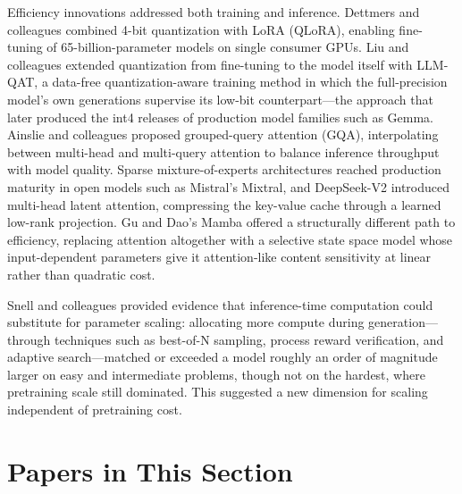 Efficiency innovations addressed both training and inference. Dettmers and colleagues combined 4-bit quantization with LoRA (QLoRA), enabling fine-tuning of 65-billion-parameter models on single consumer GPUs. Liu and colleagues extended quantization from fine-tuning to the model itself with LLM-QAT, a data-free quantization-aware training method in which the full-precision model's own generations supervise its low-bit counterpart---the approach that later produced the int4 releases of production model families such as Gemma. Ainslie and colleagues proposed grouped-query attention (GQA), interpolating between multi-head and multi-query attention to balance inference throughput with model quality. Sparse mixture-of-experts architectures reached production maturity in open models such as Mistral's Mixtral, and DeepSeek-V2 introduced multi-head latent attention, compressing the key-value cache through a learned low-rank projection. Gu and Dao's Mamba offered a structurally different path to efficiency, replacing attention altogether with a selective state space model whose input-dependent parameters give it attention-like content sensitivity at linear rather than quadratic cost.

Snell and colleagues provided evidence that inference-time computation could substitute for parameter scaling: allocating more compute during generation---through techniques such as best-of-N sampling, process reward verification, and adaptive search---matched or exceeded a model roughly an order of magnitude larger on easy and intermediate problems, though not on the hardest, where pretraining scale still dominated. This suggested a new dimension for scaling independent of pretraining cost.

\section*{Papers in This Section}

